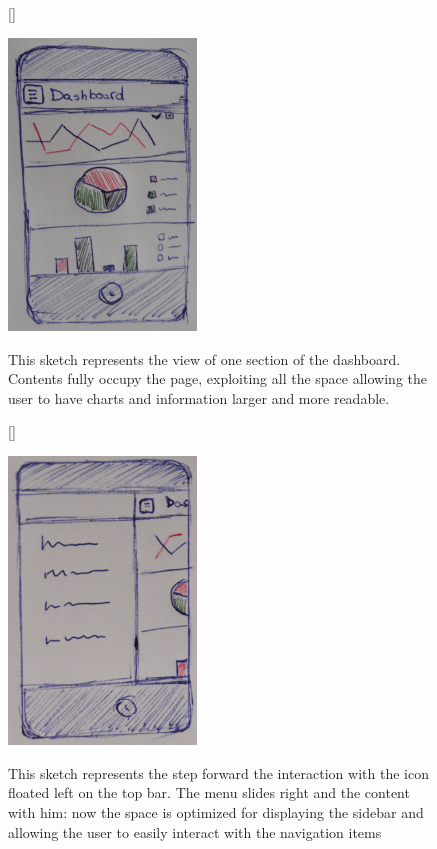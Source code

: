 \documentclass[a4paper,13pt]{report}
\begin{document}
\begin{figure}[H]
[\FBwidth]
{\caption{This sketch represents the view of one section of the dashboard. Contents fully occupy the page, exploiting all the space allowing the user to have charts and information larger and more readable.}\label{fig:test}}
{\includegraphics[width=5cm]{pics/UISketches/mobileSk1}}
\end{figure}





\begin{figure}[H]
[\FBwidth]
{\caption{This sketch represents the step forward the interaction with the icon floated left on the top bar. The menu slides right and the content with him: now the space is optimized for displaying the sidebar and allowing the user to easily interact with the navigation items}\label{fig:test}}
{\includegraphics[width=5cm]{pics/UISketches/mobileSk2}}
\end{figure}
\end{document}
